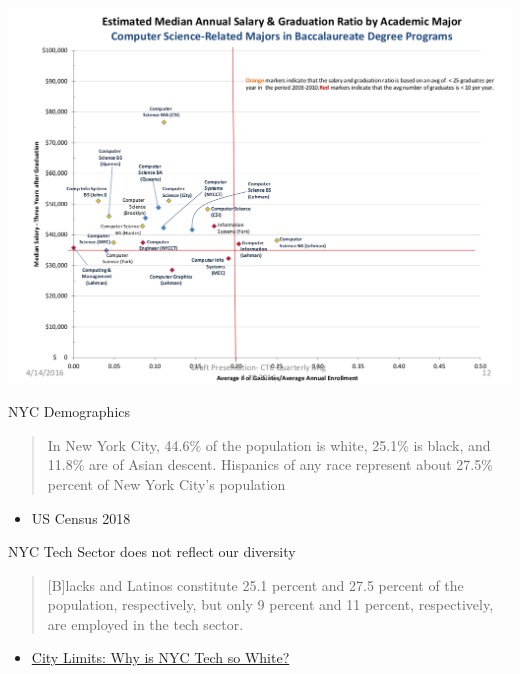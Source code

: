 \documentclass[presetation]{beamer}
\begin{document}
\begin{frame}[label={sec:org3e31d31}]{}
\begin{center}
\includegraphics[width=.9\linewidth]{./images/salaryVgraduation.png}
\end{center}
\end{frame}

\begin{frame}[label={sec:org86bc3fa}]{NYC Demographics}
\begin{quote}
In New York City, 44.6\% of the population is white, 25.1\% is black, and
11.8\% are of Asian descent. Hispanics of any race represent about
27.5\% percent of New York City's population
\end{quote}
\begin{itemize}
\item US Census 2018
\end{itemize}
\end{frame}

\begin{frame}[label={sec:orged04f44}]{NYC Tech Sector does not reflect our diversity}
\begin{quote}
[B]lacks and Latinos constitute 25.1 percent and 27.5 percent of the
population, respectively, but only 9 percent and 11 percent,
respectively, are employed in the tech sector.
\end{quote}
\begin{itemize}
\item \href{https://citylimits.org/2015/09/15/why-is-new-york-citys-growing-technology-sector-so-white/}{City Limits:  Why is NYC Tech so White?}
\end{itemize}
\end{frame}
\end{document}
